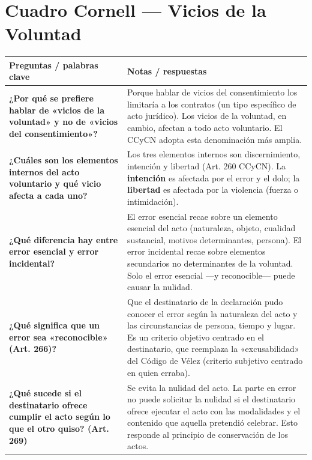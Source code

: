 \documentclass[12pt,oneside]{book}
\begin{document}
\section{Cuadro Cornell --- Vicios de la Voluntad}

\begin{table}[H]
\centering
\begin{tabularx}{\textwidth}{
    >{\raggedright\arraybackslash}p{}
    >{\raggedright\arraybackslash}X
}
\toprule
\textbf{Preguntas / palabras clave} & \textbf{Notas / respuestas} \\
\midrule

\textbf{¿Por qué se prefiere hablar de «vicios de la voluntad» y no de «vicios del consentimiento»?} &
Porque hablar de vicios del consentimiento los limitaría a los contratos (un tipo específico de acto jurídico). Los vicios de la voluntad, en cambio, afectan a todo acto voluntario. El CCyCN adopta esta denominación más amplia. \\[6pt]

\textbf{¿Cuáles son los elementos internos del acto voluntario y qué vicio afecta a cada uno?} &
Los tres elementos internos son discernimiento, intención y libertad (Art. 260 CCyCN). La \textbf{intención} es afectada por el error y el dolo; la \textbf{libertad} es afectada por la violencia (fuerza o intimidación). \\[6pt]

\textbf{¿Qué diferencia hay entre error esencial y error incidental?} &
El error esencial recae sobre un elemento esencial del acto (naturaleza, objeto, cualidad sustancial, motivos determinantes, persona). El error incidental recae sobre elementos secundarios no determinantes de la voluntad. Solo el error esencial ---y reconocible--- puede causar la nulidad. \\[6pt]

\textbf{¿Qué significa que un error sea «reconocible» (Art. 266)?} &
Que el destinatario de la declaración pudo conocer el error según la naturaleza del acto y las circunstancias de persona, tiempo y lugar. Es un criterio objetivo centrado en el destinatario, que reemplaza la «excusabilidad» del Código de Vélez (criterio subjetivo centrado en quien erraba). \\[6pt]

\textbf{¿Qué sucede si el destinatario ofrece cumplir el acto según lo que el otro quiso? (Art. 269)} &
Se evita la nulidad del acto. La parte en error no puede solicitar la nulidad si el destinatario ofrece ejecutar el acto con las modalidades y el contenido que aquella pretendió celebrar. Esto responde al principio de conservación de los actos. \\[6pt]


\end{tabularx}
\end{table}
\end{document}

